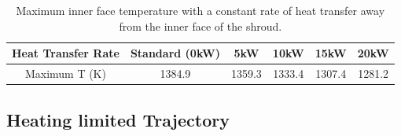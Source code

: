 \begin{table}[ht]
	\centering
	\begin{tabular}{|c|c|c|c|c|c|}
		\hline Heat Transfer Rate & Standard (0kW) & 5kW & 10kW & 15kW & 20kW \\ 
		\hline Maximum T (K) & 1384.9 & 1359.3 & 1333.4 & 1307.4 & 1281.2 \\ 
		\hline
\end{tabular}	
\caption{Maximum inner face temperature with a constant rate of heat transfer away from the inner face of the shroud.}
\label{tab:regenerativecooling}	
\end{table}



\subsection{Heating limited Trajectory}

